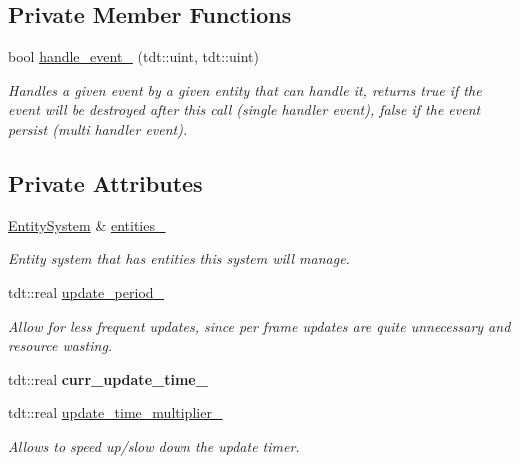 \subsection*{Private Member Functions}
\begin{DoxyCompactItemize}
\item 
bool \hyperlink{class_event_system_aab07d98ea555a11e8cbc6b340371c6ef}{handle\+\_\+event\+\_\+} (tdt\+::uint, tdt\+::uint)
\begin{DoxyCompactList}\small\item\em Handles a given event by a given entity that can handle it, returns true if the event will be destroyed after this call (single handler event), false if the event persist (multi handler event). \end{DoxyCompactList}\end{DoxyCompactItemize}
\subsection*{Private Attributes}
\begin{DoxyCompactItemize}
\item 
\hyperlink{class_entity_system}{Entity\+System} \& \hyperlink{class_event_system_ae68ff7a957934b312a0fa66f52d364c0}{entities\+\_\+}
\begin{DoxyCompactList}\small\item\em Entity system that has entities this system will manage. \end{DoxyCompactList}\item 
tdt\+::real \hyperlink{class_event_system_ae2c07675de523ca6157d766f83447d19}{update\+\_\+period\+\_\+}
\begin{DoxyCompactList}\small\item\em Allow for less frequent updates, since per frame updates are quite unnecessary and resource wasting. \end{DoxyCompactList}\item 
tdt\+::real {\bfseries curr\+\_\+update\+\_\+time\+\_\+}\hypertarget{class_event_system_a122c5df0161e22b46184d6e324d5eb4e}{}\label{class_event_system_a122c5df0161e22b46184d6e324d5eb4e}

\item 
tdt\+::real \hyperlink{class_event_system_a28113a32ef8e7f3a415251b815ac7d0f}{update\+\_\+time\+\_\+multiplier\+\_\+}
\begin{DoxyCompactList}\small\item\em Allows to speed up/slow down the update timer. \end{DoxyCompactList}\end{DoxyCompactItemize}


